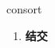
\begin{frame}
{\huge consort}
\begin{center}
\begin{enumerate}\Large
  \item \textbf{结交}
\end{enumerate}
\end{center}
\end{frame}
